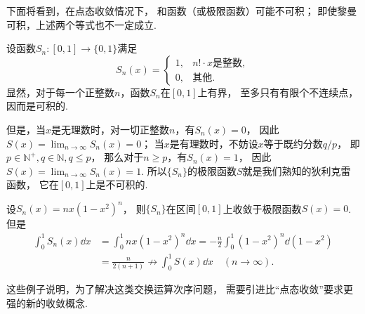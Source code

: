 下面将看到，在点态收敛情况下，
和函数（或极限函数）可能不可积；
即使黎曼可积，上述两个等式也不一定成立.
\begin{example}
设函数\(S_n\colon[0,1]\to\{0,1\}\)满足\[
	S_n(x) = \left\{ \begin{array}{cl}
		1, & \text{$n! \cdot x$是整数},  \\
		0, & \text{其他}.
	\end{array} \right.
\]
显然，对于每一个正整数\(n\)，函数\(S_n\)在\([0,1]\)上有界，
至多只有有限个不连续点，因而是可积的.

但是，当\(x\)是无理数时，对一切正整数\(n\)，有\(S_n(x) = 0\)，
因此\(S(x) = \lim_{n\to\infty} S_n(x) = 0\)；
当\(x\)是有理数时，不妨设\(x\)等于既约分数\(q/p\)，
即\(p\in\mathbb{N}^+,
q\in\mathbb{N},
q \leq p\)，
那么对于\(n \geq p\)，有\(S_n(x) = 1\)，
因此\(S(x) = \lim_{n\to\infty} S_n(x) = 1\).
所以\(\{S_n\}\)的极限函数\(S\)就是我们熟知的狄利克雷函数，
它在\([0,1]\)上是不可积的.
\end{example}
\begin{example}
设\(S_n(x) = nx(1-x^2)^n\)，
则\(\{S_n\}\)在区间\([0,1]\)上收敛于极限函数\(S(x) = 0\).
但是\begin{align*}
	\int_0^1 S_n(x) \dd{x}
	&= \int_0^1 n x (1-x^2)^n \dd{x}
	= -\frac{n}{2} \int_0^1 (1-x^2)^n \dd(1-x^2) \\
	&= \frac{n}{2(n+1)}
	\not\to \int_0^1 S(x) \dd{x}
	\quad(n\to\infty).
\end{align*}
\end{example}
这些例子说明，为了解决这类交换运算次序问题，
需要引进比“点态收敛”要求更强的新的收敛概念.

